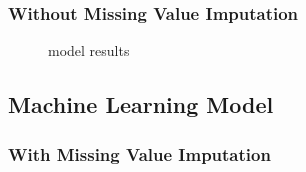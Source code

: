 \documentclass[
]{article}
\begin{document}
\subsubsection{Without Missing Value Imputation}\label{without-missing-value-imputation}

\begin{figure}[H]

{\centering {}

}

\caption{model results}\label{fig:ts2}
\end{figure}

\subsection{Machine Learning Model}\label{machine-learning-model}

\subsubsection{With Missing Value Imputation}\label{with-missing-value-imputation-1}
\end{document}
